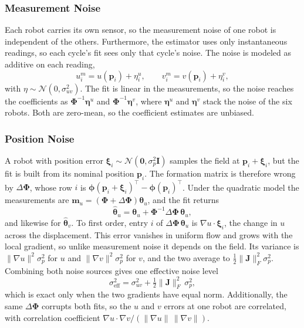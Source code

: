 \documentclass[lettersize,journal]{IEEEtran}
\begin{document}
\subsubsection{Measurement Noise}
Each robot carries its own sensor, so the measurement noise of one robot
is independent of the others. Furthermore, the estimator uses only
instantaneous readings, so each cycle's fit sees only that cycle's
noise. The noise is modeled as additive on each reading,
\begin{equation}
    u_i^m = u(\mathbf{p}_i) + \eta_i^u, \qquad
    v_i^m = v(\mathbf{p}_i) + \eta_i^v,
    \label{eq:meas_noise}
\end{equation}
with $\eta \sim \mathcal{N}(0, \sigma_{uv}^2)$. The fit is linear in the
measurements, so the noise reaches the coefficients as
$\boldsymbol{\Phi}^{-1}\boldsymbol{\eta}^u$ and
$\boldsymbol{\Phi}^{-1}\boldsymbol{\eta}^v$, where $\boldsymbol{\eta}^u$
and $\boldsymbol{\eta}^v$ stack the noise of the six robots. Both are
zero-mean, so the coefficient estimates are unbiased.

\subsubsection{Position Noise}
A robot with position error
$\boldsymbol{\xi}_i \sim \mathcal{N}(\mathbf{0}, \sigma_p^2\mathbf{I})$
samples the field at $\mathbf{p}_i + \boldsymbol{\xi}_i$, but the fit is
built from its nominal position $\mathbf{p}_i$. The formation matrix is
therefore wrong by $\Delta\boldsymbol{\Phi}$, whose row $i$ is
$\boldsymbol{\phi}(\mathbf{p}_i + \boldsymbol{\xi}_i)^{\top} -
\boldsymbol{\phi}(\mathbf{p}_i)^{\top}$. Under the quadratic model the
measurements are
$\mathbf{m}_u = (\boldsymbol{\Phi} + \Delta\boldsymbol{\Phi})
\boldsymbol{\theta}_u$, and the fit returns
\begin{equation}
    \hat{\boldsymbol{\theta}}_u = \boldsymbol{\theta}_u
        + \boldsymbol{\Phi}^{-1}\Delta\boldsymbol{\Phi}\,
          \boldsymbol{\theta}_u ,
    \label{eq:pos_noise}
\end{equation}
and likewise for $\hat{\boldsymbol{\theta}}_v$. To first order, entry
$i$ of $\Delta\boldsymbol{\Phi}\,\boldsymbol{\theta}_u$ is
$\nabla u \cdot \boldsymbol{\xi}_i$, the change in $u$ across the
displacement. This error vanishes in uniform flow and grows with the
local gradient, so unlike measurement noise it depends on the field.
Its variance is $\lVert\nabla u\rVert^2\sigma_p^2$ for $u$ and
$\lVert\nabla v\rVert^2\sigma_p^2$ for $v$, and the two average to
$\tfrac{1}{2}\lVert\mathbf{J}\rVert_F^2\sigma_p^2$. Combining both noise
sources gives one effective noise level
\begin{equation}
    \sigma_{\mathrm{eff}}^2 = \sigma_{uv}^2
        + \tfrac{1}{2}\lVert\mathbf{J}\rVert_F^2\,\sigma_p^2 ,
    \label{eq:sigma_eff}
\end{equation}
which is exact only when the two gradients have equal norm.
Additionally, the same $\Delta\boldsymbol{\Phi}$ corrupts both fits, so
the $u$ and $v$ errors at one robot are correlated, with correlation
coefficient
$\nabla u \cdot \nabla v / (\lVert\nabla u\rVert\,\lVert\nabla v\rVert)$.
\end{document}
